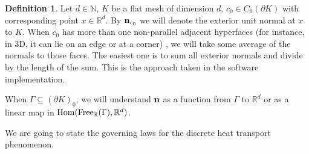\documentclass[fleqn]{article}
\theoremstyle{definition}
\newtheorem{definition}[theorem]{Definition}
\newcommand{\N}{\mathbb{N}}
\newcommand{\R}{\mathbb{R}}
\newcommand{\Hom}{\mathop{\rm Hom}\nolimits}
\begin{document}
\begin{definition}
  Let
    $d \in \N$,
    $K$ be a flat mesh of dimension $d$,
    $c_0 \in C_0(\partial K)$ with corresponding point $x \in \R^d$.
  By ${\bf n}_{c_0}$ we will denote the exterior unit normal at $x$ to $K$.
  When $c_{0}$ has more than one non-parallel adjacent hyperfaces
  (for instance, in $3$D, it can lie on an edge or at a corner) , we will take
  some average of the normals to those faces.
  The easiest one is to sum all exterior normals and divide by the length of the
  sum.
  This is the approach taken in the software implementation.

  When $\Gamma \subseteq (\partial K)_0$, we will understand ${\bf n}$ as
  a function from $\Gamma$ to $\R^d$ or as a linear map in
  $\Hom({\rm Free}_\R(\Gamma), \R^d)$.
\end{definition}

We are going to state the governing laws for the discrete heat transport
phenomenon.
\end{document}
